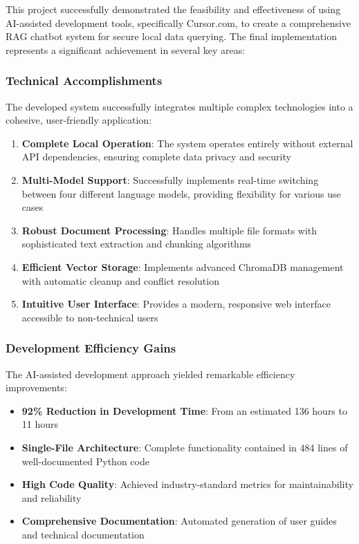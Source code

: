 This project successfully demonstrated the feasibility and effectiveness of using AI-assisted development tools, specifically Cursor.com, to create a comprehensive RAG chatbot system for secure local data querying. The final implementation represents a significant achievement in several key areas:

\subsubsection{Technical Accomplishments}

The developed system successfully integrates multiple complex technologies into a cohesive, user-friendly application:

\begin{enumerate}
    \item \textbf{Complete Local Operation}: The system operates entirely without external API dependencies, ensuring complete data privacy and security
    \item \textbf{Multi-Model Support}: Successfully implements real-time switching between four different language models, providing flexibility for various use cases
    \item \textbf{Robust Document Processing}: Handles multiple file formats with sophisticated text extraction and chunking algorithms
    \item \textbf{Efficient Vector Storage}: Implements advanced ChromaDB management with automatic cleanup and conflict resolution
    \item \textbf{Intuitive User Interface}: Provides a modern, responsive web interface accessible to non-technical users
\end{enumerate}

\subsubsection{Development Efficiency Gains}

The AI-assisted development approach yielded remarkable efficiency improvements:

\begin{itemize}
    \item \textbf{92\% Reduction in Development Time}: From an estimated 136 hours to 11 hours
    \item \textbf{Single-File Architecture}: Complete functionality contained in 484 lines of well-documented Python code
    \item \textbf{High Code Quality}: Achieved industry-standard metrics for maintainability and reliability
    \item \textbf{Comprehensive Documentation}: Automated generation of user guides and technical documentation
\end{itemize}

